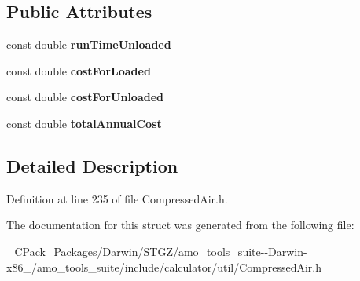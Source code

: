 \subsection*{Public Attributes}
\begin{DoxyCompactItemize}
\item 
\mbox{\label{struct_compressor_1_1_operating_cost_1_1_output_ae13051fb802def8fc6e18209db38b5aa}} 
const double {\bfseries run\+Time\+Unloaded}
\item 
\mbox{\label{struct_compressor_1_1_operating_cost_1_1_output_a4c65ee9ba069d432cf837f42a4702121}} 
const double {\bfseries cost\+For\+Loaded}
\item 
\mbox{\label{struct_compressor_1_1_operating_cost_1_1_output_a0e307a677ed5dbf7dba5b061cf5bfccf}} 
const double {\bfseries cost\+For\+Unloaded}
\item 
\mbox{\label{struct_compressor_1_1_operating_cost_1_1_output_a245a4b7baeb985a60d11b65f866563f0}} 
const double {\bfseries total\+Annual\+Cost}
\end{DoxyCompactItemize}


\subsection{Detailed Description}


Definition at line 235 of file Compressed\+Air.\+h.



The documentation for this struct was generated from the following file\+:\begin{DoxyCompactItemize}
\item 
\+\_\+\+C\+Pack\+\_\+\+Packages/\+Darwin/\+S\+T\+G\+Z/amo\+\_\+tools\+\_\+suite-\/-\/\+Darwin-\/x86\+\_/amo\+\_\+tools\+\_\+suite/include/calculator/util/Compressed\+Air.\+h\end{DoxyCompactItemize}

